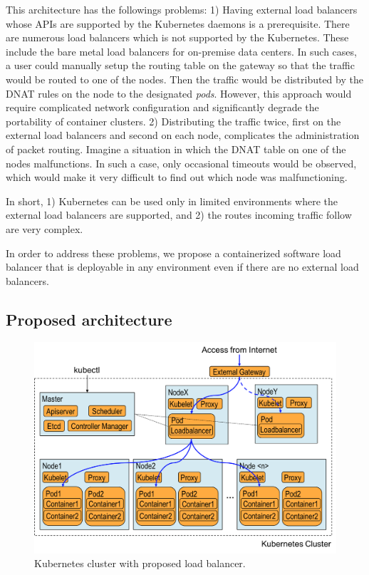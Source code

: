 This architecture has the followings problems: 
1) Having external load balancers whose APIs are supported by the Kubernetes daemons is a prerequisite. 
There are numerous load balancers which is not supported by the Kubernetes.
These include the bare metal load balancers for on-premise data centers.  
In such cases, a user could manually setup the routing table on the gateway so that the traffic would be routed to one of the nodes.
Then the traffic would be distributed by the DNAT rules on the node to the designated {\em pods}.
However, this approach would require complicated network configuration and significantly degrade the portability of container clusters.
2) Distributing the traffic twice, first on the external load balancers and second on each node, 
complicates the administration of packet routing. 
Imagine a situation in which the DNAT table on one of the nodes malfunctions.
In such a case, only occasional timeouts would be observed, which would make it very difficult to find out which node was malfunctioning.   

In short, 1) Kubernetes can be used only in limited environments where the external load balancers are supported, 
and 2) the routes incoming traffic follow are very complex.

In order to address these problems, we propose a containerized software load balancer 
that is deployable in any environment even if there are no external load balancers.

\subsection{Proposed architecture}

\begin{figure}
\includegraphics[width=\columnwidth]{Figs/K8sProposed}
\caption{Kubernetes cluster with proposed load balancer.}
\label{fig:K8sProposed}
\end{figure}

